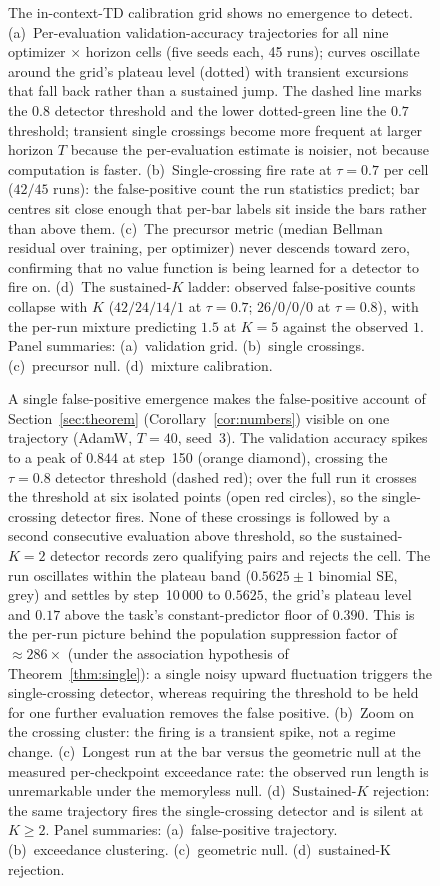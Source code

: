\documentclass[11pt]{article}
\theoremstyle{plain}
\theoremstyle{definition}
\begin{document}
\begin{figure}[htbp]
\centering
{}
\caption{The in-context-TD calibration grid shows no emergence to detect.
(a)~Per-evaluation validation-accuracy trajectories for all nine optimizer $\times$ horizon
cells (five seeds each, 45 runs); curves oscillate around the grid's plateau level (dotted) with
transient excursions that fall back rather than a sustained jump. The dashed line marks the
$0.8$ detector threshold and the lower dotted-green line the $0.7$ threshold; transient
single crossings become more frequent at larger horizon $T$ because the per-evaluation
estimate is noisier, not because computation is faster.
(b)~Single-crossing fire rate at $\tau=0.7$ per cell ($42/45$ runs): the
false-positive count the run statistics predict; bar centres sit close enough that
per-bar labels sit inside the bars rather than above them.
(c)~The precursor metric (median Bellman residual over training, per optimizer) never
descends toward zero, confirming that no value function is being learned for a detector to
fire on.
(d)~The sustained-$K$ ladder: observed false-positive counts collapse with $K$
($42/24/14/1$ at $\tau=0.7$; $26/0/0/0$ at $\tau=0.8$), with the per-run
mixture predicting $1.5$ at $K=5$ against the observed $1$.
Panel summaries: (a)~validation grid. (b)~single crossings. (c)~precursor null. (d)~mixture calibration.}
\label{fig:td-grid}
\end{figure}

\begin{figure}[htbp]
\centering
{}
\caption{A single false-positive emergence makes the false-positive account of
Section~\ref{sec:theorem} (Corollary~\ref{cor:numbers})
visible on one trajectory (AdamW, $T=40$, seed~3). The validation accuracy spikes to a
peak of $0.844$ at step~150 (orange diamond), crossing the $\tau=0.8$ detector threshold
(dashed red); over the full run it crosses the threshold at six isolated points (open red
circles), so the single-crossing detector fires. None of these crossings is followed
by a second consecutive evaluation above threshold, so the sustained-$K{=}2$
detector records zero qualifying pairs and rejects the cell. The run oscillates within the
plateau band ($0.5625 \pm 1$ binomial SE, grey) and settles by step~10\,000 to $0.5625$,
the grid's plateau level and $0.17$ above the task's constant-predictor floor of $0.390$. This is the per-run picture behind the population suppression factor of
${\approx}286\times$ (under the association hypothesis of Theorem~\ref{thm:single}): a
single noisy upward fluctuation triggers the single-crossing
detector, whereas requiring the threshold to be held for one further evaluation removes the
false positive.
(b)~Zoom on the crossing cluster: the firing is a transient spike, not a
regime change.
(c)~Longest run at the bar versus the geometric null at the measured
per-checkpoint exceedance rate: the observed run length is unremarkable under
the memoryless null.
(d)~Sustained-$K$ rejection: the same trajectory fires the single-crossing
detector and is silent at $K\geq2$.
Panel summaries: (a)~false-positive trajectory. (b)~exceedance clustering. (c)~geometric null. (d)~sustained-K rejection.}
\label{fig:case}
\end{figure}
\end{document}

